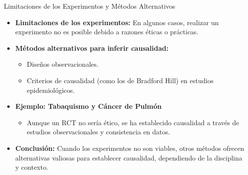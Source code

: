 ﻿\documentclass{beamer}
\begin{document}
\begin{frame}{Limitaciones de los Experimentos y Métodos Alternativos}
    \begin{itemize}
        \item \textbf{Limitaciones de los experimentos:} En algunos casos, realizar un experimento no es posible debido a razones éticas o prácticas.
        \item \textbf{Métodos alternativos para inferir causalidad:}
            \begin{itemize}
                \item Diseños observacionales.
                \item Criterios de causalidad (como los de Bradford Hill) en estudios epidemiológicos.
            \end{itemize}
        \item \textbf{Ejemplo: Tabaquismo y Cáncer de Pulmón}
            \begin{itemize}
                \item Aunque un RCT no sería ético, se ha establecido causalidad a través de estudios observacionales y consistencia en datos.
            \end{itemize}
        \item \textbf{Conclusión:} Cuando los experimentos no son viables, otros métodos ofrecen alternativas valiosas para establecer causalidad, dependiendo de la disciplina y contexto.
    \end{itemize}
\end{frame}
\end{document}
